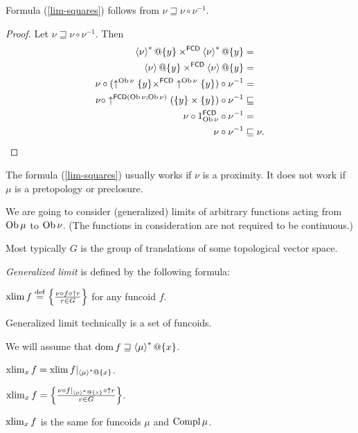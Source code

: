 \begin{prop}
Formula (\ref{lim-squares}) follows from $\nu\sqsupseteq\nu\circ\nu^{-1}$.\end{prop}
\begin{proof}
Let $\nu\sqsupseteq\nu\circ\nu^{-1}$. Then
\begin{align*}
\rsupfun{\nu}@\{y\}\times^{\mathsf{FCD}}\rsupfun{\nu}@\{y\} & =\\
\supfun{\nu}@\{y\}\times^{\mathsf{FCD}}\supfun{\nu}@\{y\} & =\\
\nu\circ(\uparrow^{\Ob\nu}\{y\}\times^{\mathsf{FCD}}\uparrow^{\Ob\nu}\{y\})\circ\nu^{-1} & =\\
\nu\circ\uparrow^{\mathsf{FCD}(\Ob\nu;\Ob\nu)}(\{y\}\times\{y\})\circ\nu^{-1} & \sqsubseteq\\
\nu\circ1_{\Ob\nu}^{\mathsf{FCD}}\circ\nu^{-1} & =\\
\nu\circ\nu^{-1} & \sqsubseteq\nu.
\end{align*}
\end{proof}
\begin{rem}
The formula (\ref{lim-squares}) usually works if $\nu$ is a proximity.
It does not work if $\mu$ is a pretopology or preclosure.
\end{rem}
We are going to consider (generalized) limits of arbitrary functions
acting from $\operatorname{Ob}\mu$ to $\operatorname{Ob}\nu$. (The functions in consideration
are not required to be continuous.)
\begin{rem}
Most typically $G$ is the group of translations of some topological
vector space.
\end{rem}
\emph{Generalized limit} is defined by the following formula:
\begin{defn}
$\operatorname{xlim} f\overset{\mathrm{def}}{=}\left\{ \frac{\nu\circ f\circ\uparrow r}{r\in G}\right\}$
for any funcoid $f$.\end{defn}
\begin{rem}
Generalized limit technically is a set of funcoids.
\end{rem}
We will assume that $\operatorname{dom} f\sqsupseteq\left\langle \mu\right\rangle ^{\ast}@\{x\}$.
\begin{defn}
$\operatorname{xlim}_{x}f=\operatorname{xlim} f|_{\left\langle \mu\right\rangle ^{\ast}@\{x\}}$.\end{defn}
\begin{obvious}
$\operatorname{xlim}_{x}f=\left\{ \frac{\nu\circ f|_{\left\langle \mu\right\rangle ^{\ast}@\{x\}}\circ\uparrow r}{r\in G}\right\}$.\end{obvious}
\begin{rem}
$\operatorname{xlim}_{x}f$ is the same for funcoids $\mu$ and $\operatorname{Compl}\mu$.
\end{rem}
